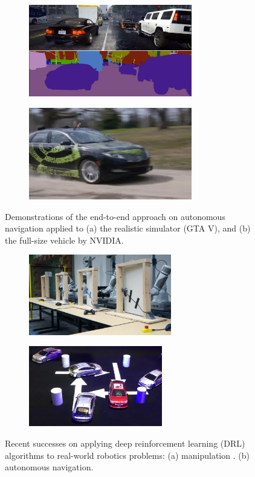 \documentclass[../thesis.tex]{subfiles}
\begin{document}
\begin{figure}[t]
    \centering
    \begin{subfigure}[b]{0.45\linewidth}
        \includegraphics[height=4cm]{./Introduction/fig/gta.jpg}
    \end{subfigure}
    \begin{subfigure}[b]{0.45\linewidth}
        \includegraphics[height=4cm]{./Introduction/fig/nvidia.jpg}
    \end{subfigure}
    \caption{Demonstrations of the end-to-end approach on autonomous navigation applied to (a) the realistic simulator (GTA V), and (b) the full-size vehicle by NVIDIA\cite{nvidiacar}.}
    \label{fig:end-to-end}
    \vskip -0.15in
\end{figure}

\begin{figure}[b]
    \vskip -0.1in
    \centering
    \begin{subfigure}[b]{0.45\linewidth}
        \includegraphics[height=3.5cm]{./Introduction/fig/drl_manipulation.jpg}
    \end{subfigure}
    \begin{subfigure}[b]{0.45\linewidth}
        \includegraphics[height=3.5cm]{./Introduction/fig/drl_perfer_network.jpg}
    \end{subfigure}
    \caption{Recent successes on applying deep reinforcement learning (DRL) algorithms to real-world robotics problems: (a) manipulation \cite{gu2016deep}. (b) autonomous navigation. \cite{prefernetwork}}
    \label{fig:end-to-end}
\end{figure}
\end{document}
